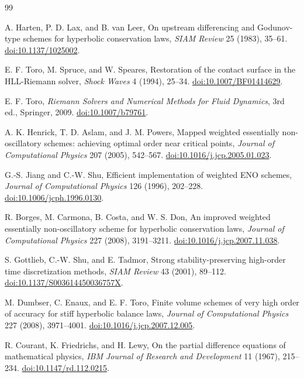\begin{thebibliography}{99}

A. Harten, P. D. Lax, and B. van Leer,
On upstream differencing and Godunov-type schemes for hyperbolic conservation laws,
\emph{SIAM Review} 25 (1983), 35--61.
\href{https://doi.org/10.1137/1025002}{doi:10.1137/1025002}.

E. F. Toro, M. Spruce, and W. Speares,
Restoration of the contact surface in the HLL-Riemann solver,
\emph{Shock Waves} 4 (1994), 25--34.
\href{https://doi.org/10.1007/BF01414629}{doi:10.1007/BF01414629}.

E. F. Toro,
\emph{Riemann Solvers and Numerical Methods for Fluid Dynamics},
3rd ed., Springer, 2009.
\href{https://doi.org/10.1007/b79761}{doi:10.1007/b79761}.

A. K. Henrick, T. D. Aslam, and J. M. Powers,
Mapped weighted essentially non-oscillatory schemes: achieving optimal order near critical points,
\emph{Journal of Computational Physics} 207 (2005), 542--567.
\href{https://doi.org/10.1016/j.jcp.2005.01.023}{doi:10.1016/j.jcp.2005.01.023}.

G.-S. Jiang and C.-W. Shu,
Efficient implementation of weighted ENO schemes,
\emph{Journal of Computational Physics} 126 (1996), 202--228.
\href{https://doi.org/10.1006/jcph.1996.0130}{doi:10.1006/jcph.1996.0130}.

R. Borges, M. Carmona, B. Costa, and W. S. Don,
An improved weighted essentially non-oscillatory scheme for hyperbolic conservation laws,
\emph{Journal of Computational Physics} 227 (2008), 3191--3211.
\href{https://doi.org/10.1016/j.jcp.2007.11.038}{doi:10.1016/j.jcp.2007.11.038}.

S. Gottlieb, C.-W. Shu, and E. Tadmor,
Strong stability-preserving high-order time discretization methods,
\emph{SIAM Review} 43 (2001), 89--112.
\href{https://doi.org/10.1137/S003614450036757X}{doi:10.1137/S003614450036757X}.

M. Dumbser, C. Enaux, and E. F. Toro,
Finite volume schemes of very high order of accuracy for stiff hyperbolic balance laws,
\emph{Journal of Computational Physics} 227 (2008), 3971--4001.
\href{https://doi.org/10.1016/j.jcp.2007.12.005}{doi:10.1016/j.jcp.2007.12.005}.

R. Courant, K. Friedrichs, and H. Lewy,
On the partial difference equations of mathematical physics,
\emph{IBM Journal of Research and Development} 11 (1967), 215--234.
\href{https://doi.org/10.1147/rd.112.0215}{doi:10.1147/rd.112.0215}.


\end{thebibliography}
